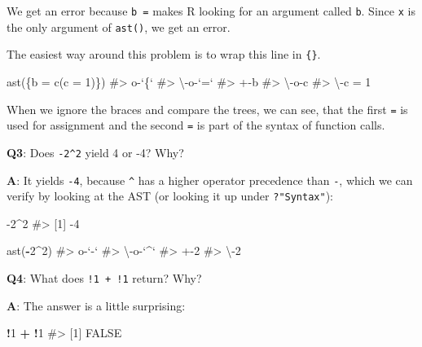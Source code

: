 \documentclass[
]{krantz}
\makeatletter
\newenvironment{Shaded}{\begin{snugshade}}{\end{snugshade}}
\newcommand{\CommentTok}[1]{\textcolor[rgb]{0.56,0.35,0.01}{\textit{#1}}}
\newcommand{\DataTypeTok}[1]{\textcolor[rgb]{0.13,0.29,0.53}{#1}}
\newcommand{\DecValTok}[1]{\textcolor[rgb]{0.00,0.00,0.81}{#1}}
\newcommand{\KeywordTok}[1]{\textcolor[rgb]{0.13,0.29,0.53}{\textbf{#1}}}
\newcommand{\NormalTok}[1]{#1}
\newcommand{\OperatorTok}[1]{\textcolor[rgb]{0.81,0.36,0.00}{\textbf{#1}}}
\newcommand{\StringTok}[1]{\textcolor[rgb]{0.31,0.60,0.02}{#1}}
\newenvironment{kframe}{%
\medskip{}
\setlength{\fboxsep}{.8em}
 \def\at@end@of@kframe{}%
 \ifinner\ifhmode%
  \def\at@end@of@kframe{\end{minipage}}%
  \begin{minipage}{\columnwidth}%
 \fi\fi%
 \def\FrameCommand##1{\hskip\@totalleftmargin \hskip-\fboxsep
 \colorbox{shadecolor}{##1}\hskip-\fboxsep
     \hskip-\linewidth \hskip-\@totalleftmargin \hskip\columnwidth}%
 \MakeFramed {\advance\hsize-\width
   \@totalleftmargin\z@ \linewidth\hsize
   \@setminipage}}%
 {\par\unskip\endMakeFramed%
 \at@end@of@kframe}
\renewenvironment{Shaded}{\begin{kframe}}{\end{kframe}}
\renewcommand{\KeywordTok} [1]{\textcolor[rgb]{0.00,0.44,0.13}{{#1}}}
\renewcommand{\DataTypeTok}[1]{\textcolor[rgb]{0.56,0.13,0.00}{{#1}}}
\renewcommand{\DecValTok}  [1]{\textcolor[rgb]{0.25,0.63,0.44}{{#1}}}
\renewcommand{\StringTok}  [1]{\textcolor[rgb]{0.25,0.44,0.63}{{#1}}}
\renewcommand{\CommentTok} [1]{\textcolor[rgb]{0.38,0.63,0.69}{{#1}}}
\renewcommand{\NormalTok}  [1]{{#1}}
\makeatother
\begin{document}
We get an error because \texttt{b\ =} makes R looking for an argument called \texttt{b}. Since \texttt{x} is the only argument of \texttt{ast()}, we get an error.

The easiest way around this problem is to wrap this line in \texttt{\{\}}.

\begin{Shaded}
\begin{Highlighting}[]
\KeywordTok{ast}\NormalTok{(\{b =}\StringTok{ }\KeywordTok{c}\NormalTok{(}\DataTypeTok{c =} \DecValTok{1}\NormalTok{)\})}
\CommentTok{#> o-`\{` }
\CommentTok{#> \textbackslash{}-o-`=` }
\CommentTok{#>   +-b }
\CommentTok{#>   \textbackslash{}-o-c }
\CommentTok{#>     \textbackslash{}-c = 1}
\end{Highlighting}
\end{Shaded}

When we ignore the braces and compare the trees, we can see, that the first \texttt{=} is used for assignment and the second \texttt{=} is part of the syntax of function calls.

\textbf{{Q3}}: Does \texttt{-2\^{}2} yield 4 or -4? Why?

\textbf{{A}}: It yields \texttt{-4}, because \texttt{\^{}} has a higher operator precedence than \texttt{-}, which we can verify by looking at the AST (or looking it up under \texttt{?"Syntax"}):

\begin{Shaded}
\begin{Highlighting}[]
\DecValTok{-2}\OperatorTok{^}\DecValTok{2}
\CommentTok{#> [1] -4}

\KeywordTok{ast}\NormalTok{(}\OperatorTok{-}\DecValTok{2}\OperatorTok{^}\DecValTok{2}\NormalTok{)}
\CommentTok{#> o-`-` }
\CommentTok{#> \textbackslash{}-o-`^` }
\CommentTok{#>   +-2 }
\CommentTok{#>   \textbackslash{}-2}
\end{Highlighting}
\end{Shaded}

\textbf{{Q4}}: What does \texttt{!1\ +\ !1} return? Why?

\textbf{{A}}: The answer is a little surprising:

\begin{Shaded}
\begin{Highlighting}[]
\OperatorTok{!}\DecValTok{1} \OperatorTok{+}\StringTok{ }\OperatorTok{!}\DecValTok{1}
\CommentTok{#> [1] FALSE}
\end{Highlighting}
\end{Shaded}
\end{document}
